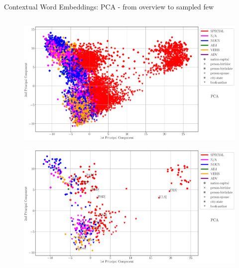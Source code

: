 \begin{frame}{Contextual Word Embeddings: PCA - from overview to sampled few}
\begin{columns}
\begin{column}{0.5\textwidth}
\begin{figure}
                \includegraphics[height=0.15\textheight]{graphics/contextual_embeddings/PCA_9512_1_2_knowbert_wiki_wordnetNone_title_USE.eps}
            \end{figure}
            \begin{figure}
                \centering
                \includegraphics[height=0.55\textheight]{graphics/contextual_embeddings/PCA_400_1_2_knowbert_wikiwordnet_annotated_title_USE.eps}
            \end{figure}
        \end{column}
    \end{columns}
\end{frame}


